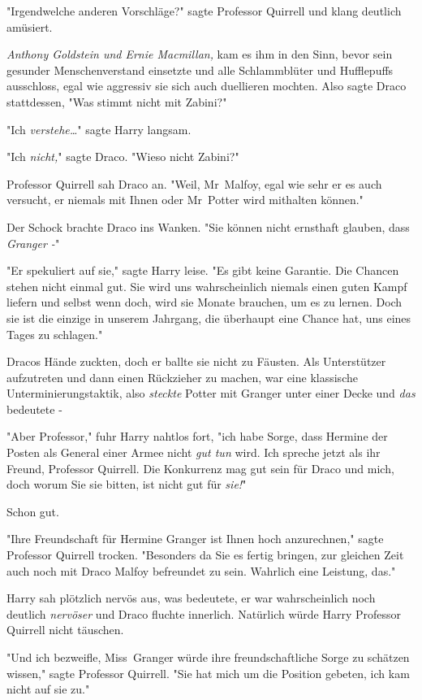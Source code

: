 {"Irgendwelche anderen Vorschläge?" sagte Professor Quirrell und klang deutlich amüsiert.

\emph{Anthony Goldstein und Ernie Macmillan,} kam es ihm in den Sinn, bevor sein gesunder Menschenverstand einsetzte und alle Schlammblüter und Hufflepuffs ausschloss, egal wie aggressiv sie sich auch duellieren mochten. Also sagte Draco stattdessen, "Was stimmt nicht mit Zabini?"

"Ich \emph{verstehe…}" sagte Harry langsam.

"Ich \emph{nicht,}" sagte Draco. "Wieso nicht Zabini?"

Professor Quirrell sah Draco an. "Weil, Mr~Malfoy, egal wie sehr er es auch versucht, er niemals mit Ihnen oder Mr~Potter wird mithalten können."

Der Schock brachte Draco ins Wanken. "Sie können nicht ernsthaft glauben, dass \emph{Granger -}"

"Er spekuliert auf sie," sagte Harry leise. "Es gibt keine Garantie. Die Chancen stehen nicht einmal gut. Sie wird uns wahrscheinlich niemals einen guten Kampf liefern und selbst wenn doch, wird sie Monate brauchen, um es zu lernen. Doch sie ist die einzige in unserem Jahrgang, die überhaupt eine Chance hat, uns eines Tages zu schlagen."

Dracos Hände zuckten, doch er ballte sie nicht zu Fäusten. Als Unterstützer aufzutreten und dann einen Rückzieher zu machen, war eine klassische Unterminierungstaktik, also \emph{steckte} Potter mit Granger unter einer Decke und \emph{das} bedeutete -

"Aber Professor," fuhr Harry nahtlos fort, "ich habe Sorge, dass Hermine der Posten als General einer Armee nicht \emph{gut tun} wird. Ich spreche jetzt als ihr Freund, Professor Quirrell. Die Konkurrenz mag gut sein für Draco und mich, doch worum Sie sie bitten, ist nicht gut für \emph{sie!}"

Schon gut.

"Ihre Freundschaft für Hermine Granger ist Ihnen hoch anzurechnen," sagte Professor Quirrell trocken. "Besonders da Sie es fertig bringen, zur gleichen Zeit auch noch mit Draco Malfoy befreundet zu sein. Wahrlich eine Leistung, das."

Harry sah plötzlich nervös aus, was bedeutete, er war wahrscheinlich noch deutlich \emph{nervöser} und Draco fluchte innerlich. Natürlich würde Harry Professor Quirrell nicht täuschen.

"Und ich bezweifle, Miss~Granger würde ihre freundschaftliche Sorge zu schätzen wissen," sagte Professor Quirrell. "Sie hat mich um die Position gebeten, ich kam nicht auf sie zu."

}
